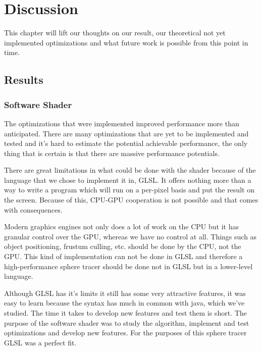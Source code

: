\chapter{Discussion} 

	This chapter will lift our thoughts on our result, our theoretical not yet
	implemented optimizations and what future work is possible from this point
	in time.
	
	\section{Results}  \label{discussion}
		
		\subsection{Software Shader}
		
            The optimizations that were implemented improved performance more than anticipated. There are many optimizations that are yet to be implemented and tested
            and it's hard to estimate the potential achievable performance, the
            only thing that is certain is that there are massive performance 
            potentials.

            There are great limitations in what could be done with the shader because of the language that we chose to implement it in, GLSL. It offers nothing more than a way to write a program which will run on a per-pixel basis and put the result on the screen. Because of this, CPU-GPU cooperation is not possible and that comes with consequences.

			Modern graphics engines not only does a lot of work on the CPU but it
			has granular control over the GPU, whereas we have no control at
			all. Things such as object positioning, frustum culling, etc.
			should be done by the CPU, not the GPU. This kind of implementation
			can not be done in GLSL and therefore a high-performance sphere
			tracer should be done not in GLSL but in a lower-level language.

            Although GLSL has it's limits it still has some very attractive 
            features, it was easy to learn because the syntax has much in common
            with java, which we've studied. The time it takes to develop new 
            features and test them is short. The purpose of the software shader 
            was to study the algorithm, implement and test optimizations and
            develop new features. For the purposes of this sphere tracer GLSL
            was a perfect fit.


